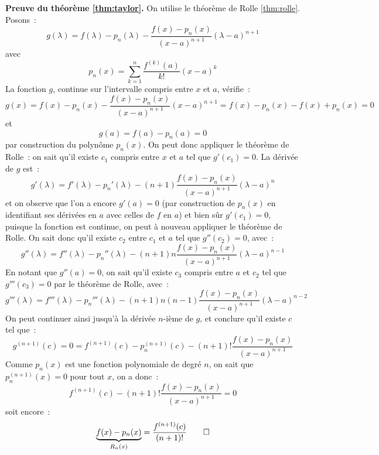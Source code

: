 \documentclass[10pt,notheorems]{beamer}
\theoremstyle{plain}
\theoremstyle{definition} %
\begin{document}
\begin{notes}
  \textbf{Preuve du théorème \hyperlink{slide_taylor_9}{\ref{thm:taylor}}.} On utilise le théorème de Rolle \hyperlink{slide_extrema_2}{\ref{thm:rolle}}. Posons~:
  \[
    g(\lambda) = f(\lambda) - p_n(\lambda) - \frac{f(x)-p_n(x)}{(x-a)^{n+1}}(\lambda-a)^{n+1}
  \]
  avec
  \[
    p_n(x) = \sum_{k=1}^n\frac{f^{(k)}(a)}{k!}(x-a)^k
  \]
  La fonction $g$, continue sur l'intervalle compris entre $x$ et $a$, vérifie~:
  \[
    g(x) = f(x) - p_n(x) - \frac{f(x)-p_n(x)}{(x-a)^{n+1}}(x-a)^{n+1} = f(x) - p_n(x) - f(x) + p_n(x) = 0
  \]
  et
  \[
    g(a) = f(a) - p_n(a) = 0
  \]
  par construction du polynôme $p_n(x)$. On peut donc appliquer le théorème de Rolle~: on sait qu'il existe $c_1$ compris entre $x$ et $a$ tel que $g'(c_1)=0$. La dérivée de $g$ est~:
  \[
    g'(\lambda) = f'(\lambda) - p_n'(\lambda) - (n+1)\frac{f(x)-p_n(x)}{(x-a)^{n+1}}(\lambda-a)^{n}
  \]
  et on observe que l'on a encore $g'(a)=0$ (par construction de $p_n(x)$ en identifiant ses dérivées en $a$ avec celles de $f$ en $a$) et bien sûr $g'(c_1)=0$, puisque la fonction est continue, on peut à nouveau appliquer le théorème de Rolle. On sait donc qu'il existe $c_2$ entre $c_1$ et $a$ tel que $g''(c_2) = 0$, avec~:
  \[
    g''(\lambda) = f''(\lambda) - p_n''(\lambda) - (n+1)n\frac{f(x)-p_n(x)}{(x-a)^{n+1}}(\lambda-a)^{n-1}
  \]
  En notant que $g''(a)=0$, on sait qu'il existe $c_3$ compris entre $a$ et $c_2$ tel que $g'''(c_3) = 0$ par le théorème de Rolle, avec~:
  \[
    g'''(\lambda) = f'''(\lambda) - p_n'''(\lambda) - (n+1)n(n-1)\frac{f(x)-p_n(x)}{(x-a)^{n+1}}(\lambda-a)^{n-2}
  \]
  On peut continuer ainsi jusqu'à la dérivée $n$-ième de $g$, et conclure qu'il existe $c$ tel que~:
  \[
    g^{(n+1)}(c) = 0 = f^{(n+1)}(c) - p_n^{(n+1)}(c) - (n+1)!\frac{f(x)-p_n(x)}{(x-a)^{n+1}}
  \]
  Comme $p_n(x)$ est une fonction polynomiale de degré $n$, on sait que $p_n^{(n+1)}(x) = 0$ pour tout $x$, on a donc~:
  \[
    f^{(n+1)}(c) - (n+1)!\frac{f(x)-p_n(x)}{(x-a)^{n+1}} = 0
  \]
  soit encore~:
  \[
    \underbrace{f(x)-p_n(x)}_{R_n(x)} = \frac{f^{(n+1)}(c)}{(n+1)!}\qed
  \]
\end{notes}
\end{document}
